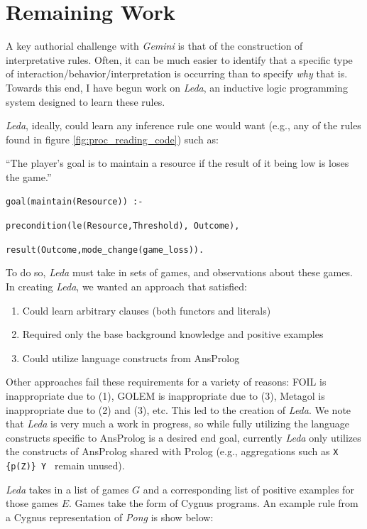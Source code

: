 \documentclass[12pt]{report}
\begin{document}
\section*{Remaining Work}

A key authorial challenge with \textit{Gemini} is that of the construction of interpretative rules.  Often, it can be much easier to identify that a specific type of interaction/behavior/interpretation is occurring than to specify \textit{why} that is.  Towards this end, I have begun work on \textit{Leda}, an inductive logic programming system designed to learn these rules.

\textit{Leda}, ideally, could learn any inference rule one would want (e.g., any of the rules found in figure \ref{fig:proc_reading_code}) such as:

``The player's goal is to maintain a resource if the result of it being low is loses the game.''

\noindent \texttt{goal(maintain(Resource)) :-}

\texttt{precondition(le(Resource,Threshold), Outcome),}

\texttt{result(Outcome,mode\_change(game\_loss)).}

\noindent To do so, \textit{Leda} must take in sets of games, and observations about these games.  In creating \textit{Leda}, we wanted an approach that satisfied:

\begin{enumerate}
\item Could learn arbitrary clauses (both functors and literals)
\item Required only the base background knowledge and positive examples
\item Could utilize language constructs from AnsProlog
\end{enumerate}

Other approaches fail these requirements for a variety of reasons: FOIL \cite{quinlan1990learning} is inappropriate due to (1), GOLEM \cite{muggleton1990efficient} is inappropriate due to (3), Metagol \cite{cropper2016learning} is inappropriate due to (2) and (3), etc. This led to the creation of \textit{Leda}. We note that \textit{Leda} is very much a work in progress, so while fully utilizing the language constructs specific to AnsProlog is a desired end goal, currently \textit{Leda} only utilizes the constructs of AnsProlog shared with Prolog (e.g., aggregations such as \texttt{X \{p(Z)\} Y } remain unused).

\textit{Leda} takes in a list of games $G$ and a corresponding list of positive examples for those games $E$. Games take the form of Cygnus \cite{martens2016proceduralist} programs. An example rule from a Cygnus representation of \textit{Pong} is show below:
\end{document}
